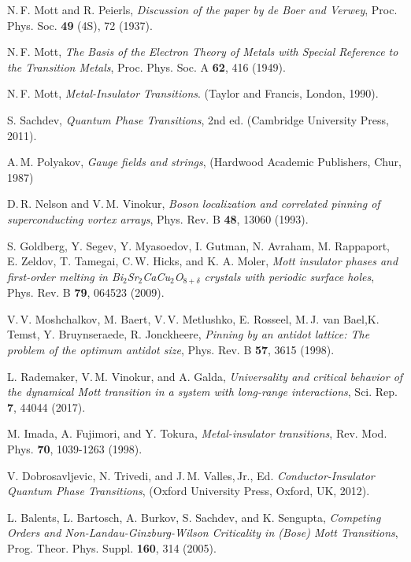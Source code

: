 \documentclass[aps,twocolumn,prl,10pt,amsmath,amssymb,nofootinbib,showpacs,superscriptaddress,floatfix]{revtex4-1}
\begin{document}
\begin{thebibliography}{10}
N.\,F. Mott and R. Peierls, 
\textit{Discussion of the paper by de Boer and Verwey}, 
Proc. Phys. Soc. \textbf{49} (4S), 72 (1937).

N.\,F. Mott, 
\textit{The Basis of the Electron Theory of Metals with Special Reference to the Transition Metals}, Proc. Phys. Soc. A \textbf{62}, 416 (1949).

N.\,F. Mott,  
\textit{Metal-Insulator Transitions}. 
(Taylor and Francis, London, 1990).

S. Sachdev, 
\textit{Quantum Phase Transitions}, 2nd ed. 
(Cambridge University Press, 2011).

A.\,M. Polyakov,
\textit{Gauge fields and strings}, 
(Hardwood Academic Publishers, Chur, 1987) 

D.\,R. Nelson and V.\,M. Vinokur, 
\textit{Boson localization and correlated pinning of superconducting vortex arrays},
Phys. Rev. B \textbf{48}, 13060 (1993).

S. Goldberg, Y. Segev, Y. Myasoedov, I. Gutman, N. Avraham, M. Rappaport, E. Zeldov, T. Tamegai, C.\,W. Hicks,
and K. A. Moler,
\textit{Mott insulator phases and first-order melting in Bi$_2$Sr$_2$CaCu$_2$O$_{8+\delta}$ crystals with periodic surface holes},
Phys. Rev. B \textbf{79}, 064523 (2009).

V.\,V. Moshchalkov, M. Baert, V.\,V. Metlushko, E. Rosseel, M.\,J. van Bael,K. Temst, Y. Bruynseraede, R. Jonckheere,  \textit{Pinning by an antidot lattice: The problem of the optimum antidot size},
Phys. Rev. B \textbf{57}, 3615 (1998).

L. Rademaker, V.\,M. Vinokur, and A. Galda,
\textit{Universality and critical behavior of the dynamical Mott transition in a system with long-range
interactions},
Sci. Rep. \textbf{7}, 44044 (2017).

M. Imada, A. Fujimori, and Y. Tokura, 
\textit{Metal-insulator transitions}, 
Rev. Mod. Phys. \textbf{70}, 1039-1263 (1998).

V. Dobrosavljevic, N. Trivedi, and J.\,M. Valles,\,Jr., Ed.
\textit{Conductor-Insulator Quantum Phase Transitions},
 (Oxford University Press, Oxford, UK, 2012).

L. Balents, L. Bartosch, A. Burkov, S. Sachdev, and K. Sengupta, \textit{Competing Orders and Non-Landau-Ginzburg-Wilson Criticality
in (Bose) Mott Transitions},
Prog. Theor. Phys. Suppl. \textbf{160}, 314 (2005).


\end{thebibliography}
\end{document}

